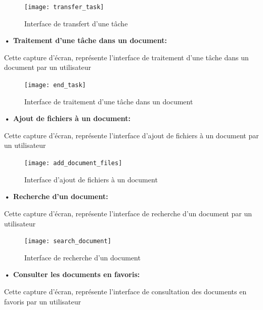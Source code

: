 \begin{figure}[H]
  \centering
  \texttt{[image: transfer\_task]}
  \caption{Interface de transfert d'une tâche}
  \label{fig:transfer_task}
\end{figure}

\textbf{•	Traitement d'une tâche dans un document:}

Cette capture d'écran, représente l'interface de traitement d'une tâche dans un document par un utilisateur

\begin{figure}[H]
  \centering
  \texttt{[image: end\_task]}
  \caption{Interface de traitement d'une tâche dans un document}
  \label{fig:end_task}
\end{figure}




\textbf{•	Ajout de fichiers à un document:}

Cette capture d'écran, représente l'interface d'ajout de fichiers à un document par un utilisateur

\begin{figure}[H]
  \centering
  \texttt{[image: add\_document\_files]}
  \caption{Interface d'ajout de fichiers à un document}
  \label{fig:add_document_files}
\end{figure}





\textbf{•	Recherche d'un document:}

Cette capture d'écran, représente l'interface de recherche d'un document par un utilisateur

\begin{figure}[H]
  \centering
  \texttt{[image: search\_document]}
  \caption{Interface de recherche d'un document}
  \label{fig:search_document}
\end{figure}

\textbf{•	Consulter les documents en favoris:}

Cette capture d'écran, représente l'interface de consultation des documents en favoris par un utilisateur

